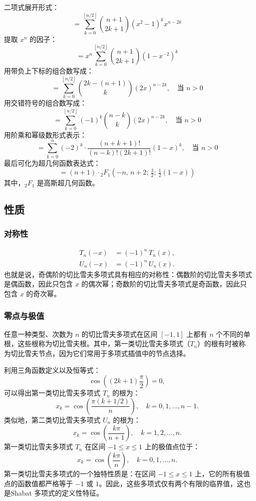 二项式展开形式：
$$
= \sum_{k=0}^{\left\lfloor n/2 \right\rfloor} \binom{n+1}{2k+1} (x^2 - 1)^k x^{n - 2k}~
$$
提取 $x^n$ 的因子：
$$
= x^n \sum_{k=0}^{\left\lfloor n/2 \right\rfloor} \binom{n+1}{2k+1} \left(1 - x^{-2}\right)^k~
$$
用带负上下标的组合数写成：
$$
= \sum_{k=0}^{\left\lfloor n/2 \right\rfloor} \binom{2k - (n + 1)}{k} (2x)^{n - 2k}, \quad \text{当 } n > 0~
$$
用交错符号的组合数写成：
$$
= \sum_{k=0}^{\left\lfloor n/2 \right\rfloor} (-1)^k \binom{n - k}{k} (2x)^{n - 2k}, \quad \text{当 } n > 0~
$$
用阶乘和幂级数形式表示：
$$
= \sum_{k=0}^{n} (-2)^k \cdot \frac{(n + k + 1)!}{(n - k)! (2k + 1)!} (1 - x)^k, \quad \text{当 } n > 0~
$$
最后可化为超几何函数表达式：
$$
= (n + 1) \cdot {}_2F_1\left(-n,\, n + 2;\, \tfrac{3}{2};\, \tfrac{1}{2}(1 - x)\right)~
$$
其中，${}_2F_1$ 是高斯超几何函数。
\subsection{性质}
\subsubsection{对称性}
$$
\begin{aligned}
T_n(-x) &= (-1)^n\, T_n(x), \\
U_n(-x) &= (-1)^n\, U_n(x).
\end{aligned}~
$$
也就是说，奇偶阶的切比雪夫多项式具有相应的对称性：偶数阶的切比雪夫多项式是偶函数，因此只包含 $x$ 的偶次幂；奇数阶的切比雪夫多项式是奇函数，因此只包含 $x$ 的奇次幂。
\subsubsection{零点与极值}
任意一种类型、次数为 $n$ 的切比雪夫多项式在区间 $[-1,1]$ 上都有 $n$ 个不同的单根，这些根称为切比雪夫根。其中，第一类切比雪夫多项式（$T_n$）的根有时被称为切比雪夫节点，因为它们常用于多项式插值中的节点选择。

利用三角函数定义以及恒等式：
$$
\cos\left((2k + 1)\frac{\pi}{2}\right) = 0,~
$$
可以得出第一类切比雪夫多项式 $T_n$ 的根为：
$$
x_k = \cos\left(\frac{\pi(k + 1/2)}{n}\right),\quad k = 0, 1, \dots, n - 1.~
$$
类似地，第二类切比雪夫多项式 $U_n$ 的根为：
$$
x_k = \cos\left(\frac{k\pi}{n + 1}\right),\quad k = 1, 2, \dots, n.~
$$
第一类切比雪夫多项式 $T_n$ 在区间 $-1 \leq x \leq 1$ 上的极值点位于：
$$
x_k = \cos\left(\frac{k\pi}{n}\right),\quad k = 0, 1, \dots, n.~
$$
第一类切比雪夫多项式的一个独特性质是：在区间 $-1 \leq x \leq 1$ 上，它的所有极值点的函数值都严格等于 $-1$ 或 $1$。因此，这些多项式仅有两个有限的临界值，这也是Shabat 多项式的定义性特征。

